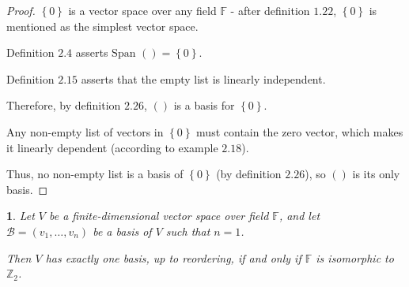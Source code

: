 \documentclass[english]{article}
\theoremstyle{definition}
\theoremstyle{plain}
\theoremstyle{remark}
\theoremstyle{plain}
\theoremstyle{plain}
\newtheorem{lem}[thm]{\protect\lemmaname}
\providecommand{\lemmaname}{Lemma}
\begin{document}
\begin{proof}
$\left\{ 0\right\} $ is a vector space over any field $\mathbb{F}$
- after definition $1.22$, $\left\{ 0\right\} $ is mentioned as
the simplest vector space.

Definition $2.4$ asserts $\text{Span }()=\left\{ 0\right\} $.

Definition $2.15$ asserts that the empty list is linearly independent. 

Therefore, by definition $2.26$, $\left(\right)$ is a basis for
$\left\{ 0\right\} $.

Any non-empty list of vectors in $\left\{ 0\right\} $ must contain
the zero vector, which makes it linearly dependent (according to example
$2.18$).

Thus, no non-empty list is a basis of $\left\{ 0\right\} $ (by definition
$2.26$), so $\left(\right)$ is its only basis.
\end{proof}
\newpage{}
\begin{lem}
Let $V$ be a finite-dimensional vector space over field $\mathbb{F}$,
and let $\mathcal{B}=\left(v_{1},\dots,v_{n}\right)$ be a basis of
$V$ such that $n=1$. 

Then $V$ has exactly one basis, up to reordering, if and only if
$\mathbb{F}$ is isomorphic to $\mathbb{Z}_{2}$.
\end{lem}
\end{document}
